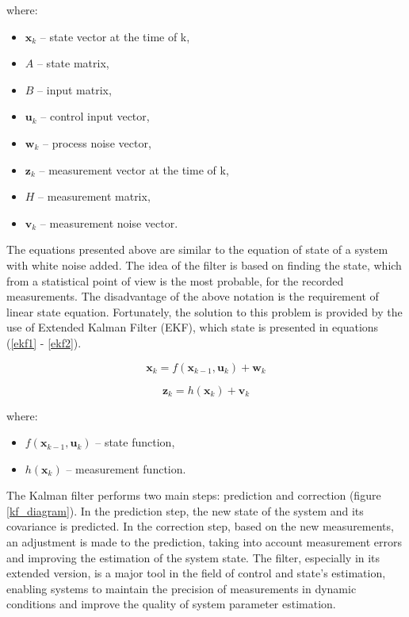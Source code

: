 where:
\begin{itemize}[noitemsep]
	\item $\bm{x}_k$ -- state vector at the time of k, 
	\item $A$ -- state matrix, 
	\item $B$  -- input matrix, 
	\item $\bm{u}_k$  -- control input vector, 
	\item $\bm{w}_k$ -- process noise vector, 
	\item $\bm{z}_k$  -- measurement vector at the time of k, 
	\item $H$ -- measurement matrix,
	\item $\bm{v}_k$ -- measurement noise vector.
\end{itemize}

The equations presented above are similar to the equation of state of a system with white noise added. The idea of the filter is based on finding the state, which from a statistical point of view is the most probable, for the recorded measurements. The disadvantage of the above notation is the requirement of linear state equation. Fortunately, the solution to this problem is provided by the use of Extended Kalman Filter (EKF), which state is presented in equations (\ref{ekf1} - \ref{ekf2}).

\begin{equation}
	\bm{x}_k =  f \left( \bm{x}_{k-1},  \bm{u}_k \right) + \bm{w}_k
	\label{ekf1}
\end{equation}

\begin{equation}
	\bm{z}_k = h \left(\bm{x}_k \right) + \bm{v}_k
	\label{ekf2}
\end{equation}


where:
\begin{itemize}
	\item $ f \left( \bm{x}_{k-1},  \bm{u}_k \right)$ -- state function, 
	\item $h \left(\bm{x}_k \right)$ -- measurement function.
\end{itemize}

The Kalman filter performs two main steps: prediction and correction (figure \ref{kf_diagram}). In the prediction step, the new state of the system and its covariance is predicted. In the correction step, based on the new measurements, an adjustment is made to the prediction, taking into account measurement errors and improving the estimation of the system state. The filter, especially in its extended version, is a major tool in the field of control and state's estimation, enabling systems to maintain the precision of measurements in dynamic conditions and improve the quality of system parameter estimation.\\


